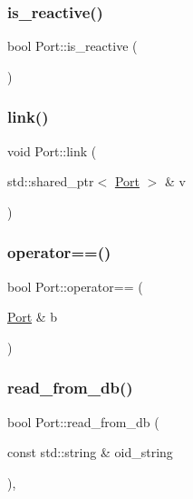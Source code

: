 \mbox{\label{class_port_a1f80bb4edc0bdc8268f4c93ef618bef4}} 
\subsubsection{\texorpdfstring{is\+\_\+reactive()}{is\_reactive()}}
{\footnotesize\ttfamily bool Port\+::is\+\_\+reactive (\begin{DoxyParamCaption}{ }\end{DoxyParamCaption})\hspace{0.3cm}{\ttfamily [inline]}}

\mbox{\label{class_port_aec33d8bfca05139b1e319f15d2b3a1b8}} 
\subsubsection{\texorpdfstring{link()}{link()}}
{\footnotesize\ttfamily void Port\+::link (\begin{DoxyParamCaption}\item[{std\+::shared\+\_\+ptr$<$ \hyperlink{class_port}{Port} $>$ \&}]{v }\end{DoxyParamCaption})}

\mbox{\label{class_port_acecdaea3f5917240a7ff36c5186b57d6}} 
\subsubsection{\texorpdfstring{operator==()}{operator==()}}
{\footnotesize\ttfamily bool Port\+::operator== (\begin{DoxyParamCaption}\item[{\hyperlink{class_port}{Port} \&}]{b }\end{DoxyParamCaption})\hspace{0.3cm}{\ttfamily [inline]}}

\mbox{\label{class_port_a952b0b030c884147a36be7a04eb22183}} 
\subsubsection{\texorpdfstring{read\+\_\+from\+\_\+db()}{read\_from\_db()}}
{\footnotesize\ttfamily bool Port\+::read\+\_\+from\+\_\+db (\begin{DoxyParamCaption}\item[{const std\+::string \&}]{oid\+\_\+string }\end{DoxyParamCaption})\hspace{0.3cm}{\ttfamily [inline]}, {\ttfamily [virtual]}}



